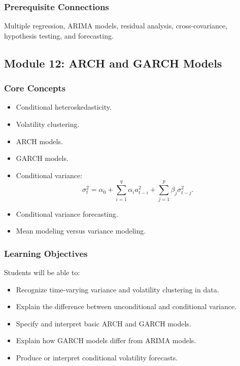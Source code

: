 \documentclass[11pt]{article}
\begin{document}
\subsubsection{Prerequisite Connections}

Multiple regression, ARIMA models, residual analysis, cross-covariance,
hypothesis testing, and forecasting.

\subsection{Module 12: ARCH and GARCH Models}

\subsubsection{Core Concepts}

\begin{itemize}
    \item Conditional heteroskedasticity.
    \item Volatility clustering.
    \item ARCH models.
    \item GARCH models.
    \item Conditional variance:
    \[
    \sigma_t^2 = \alpha_0 + \sum_{i=1}^{q}\alpha_i a_{t-i}^2
    + \sum_{j=1}^{p}\beta_j\sigma_{t-j}^2.
    \]
    \item Conditional variance forecasting.
    \item Mean modeling versus variance modeling.
\end{itemize}

\subsubsection{Learning Objectives}

Students will be able to:

\begin{itemize}
    \item Recognize time-varying variance and volatility clustering in data.
    \item Explain the difference between unconditional and conditional variance.
    \item Specify and interpret basic ARCH and GARCH models.
    \item Explain how GARCH models differ from ARIMA models.
    \item Produce or interpret conditional volatility forecasts.
\end{itemize}
\end{document}
